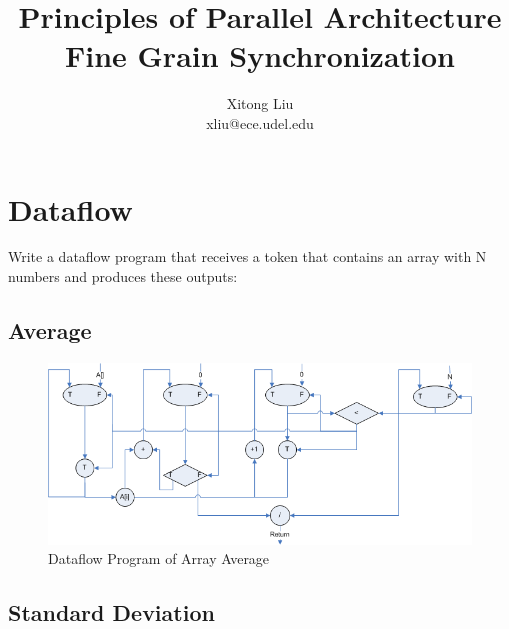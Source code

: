 \documentclass[12pt]{article}
\title{Principles of Parallel Architecture\\
Fine Grain Synchronization}
\author{Xitong Liu \\
xliu@ece.udel.edu}
\begin{document}
\maketitle

\section{Dataflow}
Write a dataflow program that receives a token that contains an 
array with N numbers and produces these outputs:
\begin{enumerate}
\end{enumerate}
\subsection{Average}
\begin{figure}[h!]
	\begin{center}
		\includegraphics[width=1.0\textwidth, angle=0]{average.png}
		\caption{\label{fig:png}Dataflow Program of Array Average}
	\end{center}
\end{figure}
\subsection{Standard Deviation}
\end{document}
